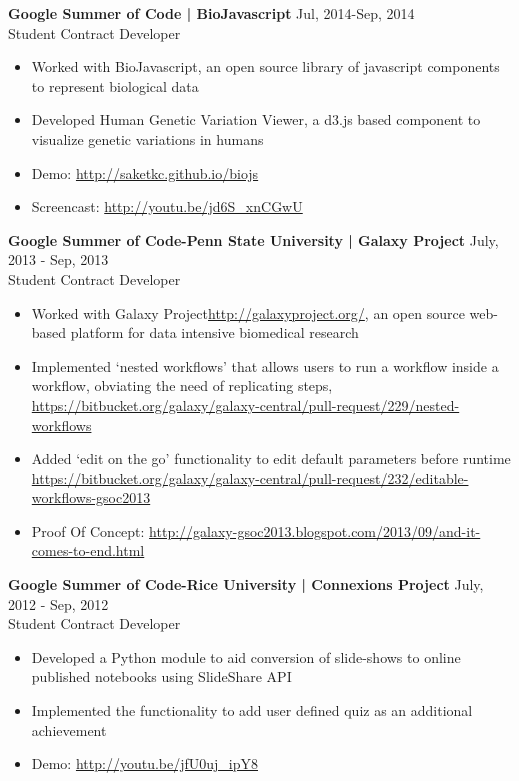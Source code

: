 \documentclass[margin,line]{res}
\begin{document}
\begin{resume}
\vspace{.3cm}
{\textbf{Google Summer of Code | BioJavascript}} \hfill {Jul, 2014-Sep, 2014}\\
{Student Contract Developer}\\
\begin{itemize}
\item {Worked with BioJavascript, an open source library of javascript components to represent biological data}
\item {Developed Human Genetic Variation Viewer, a d3.js based component to visualize genetic variations in humans}
\item {Demo: \url{http://saketkc.github.io/biojs}}
\item{Screencast: \url{http://youtu.be/jd6S_xnCGwU}}
\end{itemize}

\vspace{.3cm}
{\textbf{Google Summer of Code-Penn State University | Galaxy Project}} \hfill {July, 2013 - Sep, 2013}\\
{Student Contract Developer}\\
\begin{itemize}		
\item{Worked with  Galaxy Project\url{http://galaxyproject.org/}, an open source web-based platform for data intensive biomedical research}
\item{Implemented `nested workflows' that allows users to run a workflow inside a workflow, obviating the need of replicating steps, \url{https://bitbucket.org/galaxy/galaxy-central/pull-request/229/nested-workflows}}  
\item{Added `edit on the go' functionality to edit default parameters before runtime \url{https://bitbucket.org/galaxy/galaxy-central/pull-request/232/editable-workflows-gsoc2013}}
\item{Proof Of Concept: \url{http://galaxy-gsoc2013.blogspot.com/2013/09/and-it-comes-to-end.html}}
\end{itemize}

\vspace{.3cm}
{\textbf{Google Summer of Code-Rice University | Connexions Project}} \hfill {July, 2012 - Sep, 2012}\\
{Student Contract Developer}\\
\begin{itemize}
\item {Developed a Python module  to aid conversion of slide-shows to online published notebooks using SlideShare API}
\item {Implemented the functionality to add user defined quiz as an additional achievement}
\item {Demo: \url{http://youtu.be/jfU0uj_ipY8}}
\end{itemize}


\end{resume}
\end{document}
